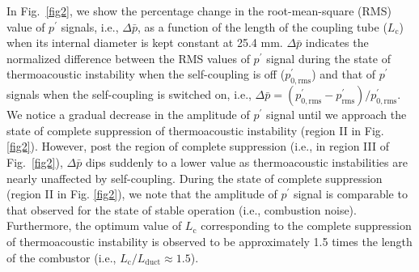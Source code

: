 \documentclass[twocolumn,10pt]{article} %
\begin{document}
In Fig.~\ref{fig2}, we show the percentage change in the root-mean-square (RMS) value of $p^{\prime}$ signals, i.e., $\Delta \bar{p}$, as a function of the length of the coupling tube ($L_{\text{c}}$) when its internal diameter is kept constant at 25.4 mm. $\Delta \bar{p}$ indicates the normalized difference between the RMS values of $p^{\prime}$ signal during the state of thermoacoustic instability when the self-coupling is off ($p^\prime_{0,\text{rms}}$) and that of $p^{\prime}$ signals when the self-coupling is switched on, i.e., $\Delta \bar{p} = (p^\prime_{0,\text{rms}}-p^\prime_{\text{rms}})/p^\prime_{0,\text{rms}}$. We notice a gradual decrease in the amplitude of $p^{\prime}$ signal until we  approach the state of complete suppression of thermoacoustic instability (region II in Fig. \ref{fig2}). However, post the region of complete suppression (i.e., in region III of Fig.~\ref{fig2}), $\Delta \bar{p}$ dips suddenly to a lower value as thermoacoustic instabilities  are nearly unaffected by self-coupling. During the state of complete suppression (region II in Fig. \ref{fig2}), we note that the amplitude of $p^{\prime}$ signal is comparable to that observed for the state of stable operation (i.e., combustion noise). Furthermore, the optimum value of $L_{\text{c}}$ corresponding to the complete suppression of thermoacoustic instability is observed to be approximately 1.5 times the length of the combustor (i.e., $L_{\text{c}}/L_{\text{duct}} \approx 1.5$).
\end{document}
